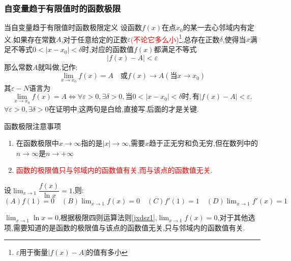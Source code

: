 \documentclass[8pt a4paper, oneside, UTF8]{ctexbook}
\begin{document}
\begin{sloppypar}
    \subsubsection{自变量趋于有限值时的函数极限}
    \begin{defn}{当自变量趋于有限值时函数极限定义}{}
        设函数$f(x)$在点$x_0$的某一去心邻域内有定义.如果存在常数$A$,对于任意给定的正数$\varepsilon$\textcolor{red}{(不论它多么小)\footnote{$\varepsilon$用于衡量$|f(x)-A|$的值有多小}},总存在正数$\delta$,使得当$x$满足不等式$0<|x-x_0|<\delta$时,对应的函数值$f(x)$都满足不等式
        $$
            |f(x)-A|<\varepsilon
        $$
        那么常数$A$就叫做,记作:
        $$
            \lim_{x\to x_0}f(x)=A\quad\text{或}f(x)\to A(\text{当}x\to x_0)
        $$
        其$\varepsilon-N$语言为
        $$
            \lim_{x\to x_0}f(x)=A\Leftrightarrow\forall\varepsilon>0,\exists\delta>0,\text{当}0<|x-x_0|<\delta\text{时},\text{有}|f(x)-A|<\varepsilon.
        $$
        $\forall\varepsilon>0,\exists\delta>0$在证明中,这两句是白给,直接写.后面的才是关键.
    \end{defn}
    \begin{criterion}{函数极限注意事项}{}
        \begin{enumerate}
            \item 在函数极限中$x \to \infty$指的是$|x| \to \infty$,需要$x$趋于正无穷和负无穷,但在数列中的$n \to \infty$是$n \to +\infty$
            \item \textcolor{red}{函数的极限值只与邻域内的函数值有关,而与该点的函数值无关}.
        \end{enumerate}
    \end{criterion}
    \begin{problem}
        设$\lim_{x \to 1}\dfrac{f(x)}{\ln x}=1$,则:\\
        $(A) f(1)=0 \quad (B)\lim_{x\to 1}f(x)=0 \quad (C)f'(1)=1 \quad (D)\lim_{x \to 1}f'(x)=1$
    \end{problem}
    \begin{solution}
        $\lim_{x\to 1}\ln x=0$,根据极限四则运算法则\ref{jxdsz1},$\lim_{x \to 1} f(x)=0$,对于其他选项,需要知道的是函数的极限值与该点的函数值无关,只与邻域内的函数值有关.
    \end{solution}

\end{sloppypar}
\end{document}
